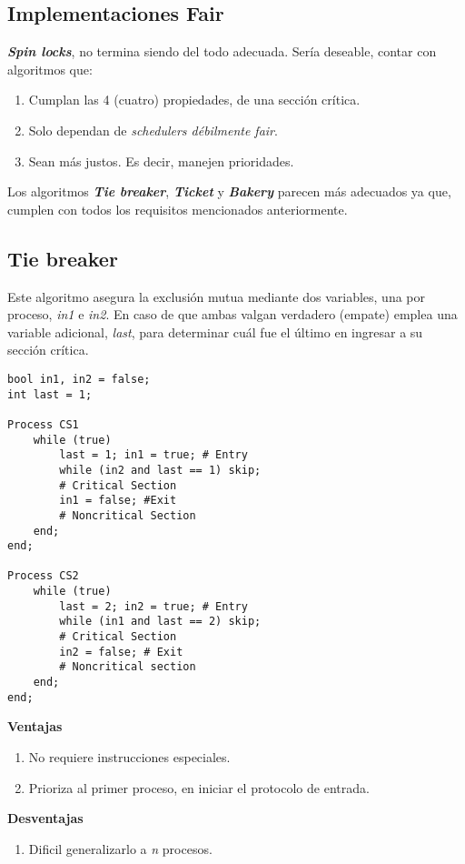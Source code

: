 \documentclass[a4paper, 11pt]{book}
\begin{document}
\subsection{Implementaciones Fair}
\textbf{\emph{Spin locks}}, no termina siendo del todo adecuada. Sería deseable, contar con algoritmos que:
\begin{enumerate}
    \item Cumplan las 4 (cuatro) propiedades, de una sección crítica.
    \item Solo dependan de \emph{schedulers débilmente fair}.
    \item Sean más justos. Es decir, manejen prioridades.
\end{enumerate}

Los algoritmos \textbf{\emph{Tie breaker}}, \textbf{\emph{Ticket}} y \textbf{\emph{Bakery}} parecen más adecuados ya que, cumplen con todos los requisitos mencionados anteriormente.

\subsection{Tie breaker}

Este algoritmo asegura la exclusión mutua mediante dos variables, una por proceso, \emph{in1} e \emph{in2}. En caso de que ambas valgan verdadero (empate) emplea una variable adicional, \emph{last}, para determinar cuál fue el último en ingresar a su sección crítica.

\begin{lstlisting}
bool in1, in2 = false;
int last = 1;
    
Process CS1
    while (true)
        last = 1; in1 = true; # Entry
        while (in2 and last == 1) skip;
        # Critical Section
        in1 = false; #Exit
        # Noncritical Section
    end;
end;
    
Process CS2
    while (true)
        last = 2; in2 = true; # Entry
        while (in1 and last == 2) skip;
        # Critical Section
        in2 = false; # Exit
        # Noncritical section
    end;
end;
\end{lstlisting}

\textbf{Ventajas}
\begin{enumerate}
    \item No requiere instrucciones especiales.
    \item Prioriza al primer proceso, en iniciar el protocolo de entrada.
\end{enumerate}

\textbf{Desventajas}
\begin{enumerate}
    \item Dificil generalizarlo a \emph{n} procesos.
\end{enumerate}
\end{document}
